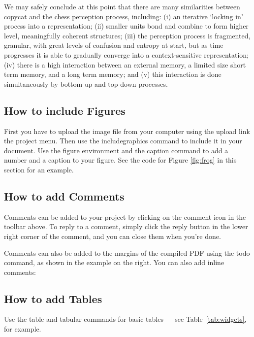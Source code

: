 \documentclass[a4paper]{article}
\begin{document}
We may safely conclude at this point that there are many similarities between copycat and the chess perception process, including: (i) an iterative ‘locking in’ process into a representation; (ii) smaller units bond and combine to form higher level, meaningfully coherent structures; (iii) the perception process is fragmented, granular, with great levels of confusion and entropy at start, but as time progresses it is able to gradually converge into a context-sensitive representation; (iv) there is a high interaction between an external memory, a limited size short term memory, and a long term memory; and (v) this interaction is done simultaneously by bottom-up and top-down processes.  

\subsection{How to include Figures}


First you have to upload the image file from your computer using the upload link the project menu. Then use the includegraphics command to include it in your document. Use the figure environment and the caption command to add a number and a caption to your figure. See the code for Figure \ref{fig:frog} in this section for an example.




\subsection{How to add Comments}

Comments can be added to your project by clicking on the comment icon in the toolbar above. %
%
%
To reply to a comment, simply click the reply button in the lower right corner of the comment, and you can close them when you're done.

Comments can also be added to the margins of the compiled PDF using the todo command, as shown in the example on the right. You can also add inline comments:


\subsection{How to add Tables}

Use the table and tabular commands for basic tables --- see Table~\ref{tab:widgets}, for example. 
\end{document}

